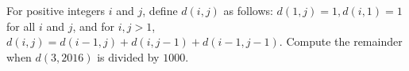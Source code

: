 For positive integers $i$ and $j$, define $d(i,j)$ as follows: $d(1,j) = 1, d(i,1) = 1$ for all $i$ and $j$, and for $i, j > 1$, $d(i,j) = d(i-1,j) + d(i,j-1) + d(i-1,j-1)$. Compute the remainder when $d(3,2016)$ is divided by $1000$.